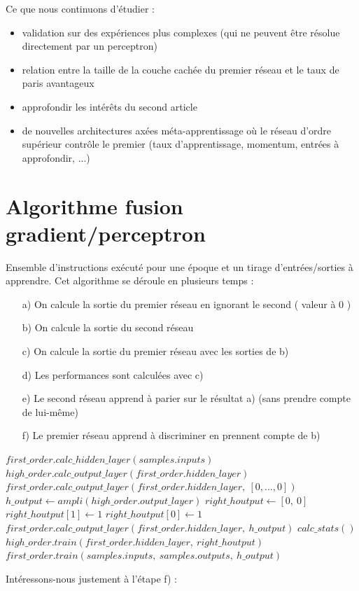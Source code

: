 \documentclass[a4paper,12pt, twoside]{article}
\begin{document}
Ce que nous continuons d'étudier : 
\begin{itemize}
 \item validation sur des expériences plus complexes (qui ne peuvent être résolue directement par un perceptron)
 \item relation entre la taille de la couche cachée du premier réseau et le taux de paris avantageux
 \item approfondir les intérêts du second article \cite{Pasquali_2010}
 \item de nouvelles architectures axées méta-apprentissage où le réseau d'ordre supérieur contrôle le premier
 (taux d'apprentissage, momentum, entrées à approfondir, ...)
\end{itemize}





\newpage
\appendix
\section{Algorithme fusion gradient/perceptron}

Ensemble d'instructions exécuté pour une époque et un tirage d'entrées/sorties à apprendre.
\newline
Cet algorithme se déroule en plusieurs temps :
\begin{itemize}
 \item[a)] On calcule la sortie du premier réseau en ignorant le second ( valeur à 0 )
 \item[b)] On calcule la sortie du second réseau
 \item[c)] On calcule la sortie du premier réseau avec les sorties de b)
 \item[d)] Les performances sont calculées avec c)
 \item[e)] Le second réseau apprend à parier sur le résultat a) (sans prendre compte de lui-même)
 \item[f)] Le premier réseau apprend à discriminer en prennent compte de b)
 \\[0.7cm]
\end{itemize}

\begin{algorithmic}

\State $first\_order.calc\_hidden\_layer(samples.inputs)$
\State $high\_order.calc\_output\_layer(first\_order.hidden\_layer)$
\State $first\_order.calc\_output\_layer(first\_order.hidden\_layer,\ [0, ..., 0])$
\State 
\State $h\_output \gets ampli(high\_order.output\_layer)$
\State $right\_houtput \gets [0,\ 0]$
  \State $right\_houtput[1] \gets 1$
\Else
  \State $right\_houtput[0] \gets 1$
\EndIf
\State $first\_order.calc\_output\_layer(first\_order.hidden\_layer,\ h\_output)$
\State
\State $calc\_stats()$
\State
\State $high\_order.train(first\_order.hidden\_layer,\ right\_houtput)$
\State $first\_order.train(samples.inputs,\ samples.outputs,\ h\_output)$
\State
\State
\end{algorithmic}
Intéressons-nous justement à l'étape f) :
\\[0.7cm]
\end{document}
